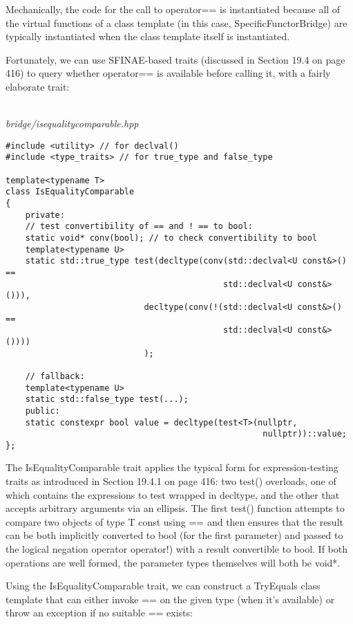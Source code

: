 \begin{tcolorbox}[colback=webgreen!5!white,colframe=webgreen!75!black]
\hspace*{0.75cm}Mechanically, the code for the call to operator== is instantiated because all of the virtual functions of a class template (in this case, SpecificFunctorBridge) are typically instantiated when the class template itself is instantiated.
\end{tcolorbox}

Fortunately, we can use SFINAE-based traits (discussed in Section 19.4 on page 416) to query whether operator== is available before calling it, with a fairly elaborate trait:

\hspace*{\fill} \\ %
\noindent
\textit{bridge/isequalitycomparable.hpp}
\begin{lstlisting}[style=styleCXX]
#include <utility> // for declval()
#include <type_traits> // for true_type and false_type

template<typename T>
class IsEqualityComparable
{
	private:
	// test convertibility of == and ! == to bool:
	static void* conv(bool); // to check convertibility to bool
	template<typename U>
	static std::true_type test(decltype(conv(std::declval<U const&>() ==
											std::declval<U const&>())),
							decltype(conv(!(std::declval<U const&>() ==
											std::declval<U const&>())))
							);
	
	// fallback:
	template<typename U>
	static std::false_type test(...);
	public:
	static constexpr bool value = decltype(test<T>(nullptr,
													nullptr))::value;
};
\end{lstlisting}

The IsEqualityComparable trait applies the typical form for expression-testing traits as introduced in Section 19.4.1 on page 416: two test() overloads, one of which contains the expressions to test wrapped in decltype, and the other that accepts arbitrary arguments via an ellipsis. The first test() function attempts to compare two objects of type T const using == and then ensures that the result can be both implicitly converted to bool (for the first parameter) and passed to the logical negation operator operator!) with a result convertible to bool. If both operations are well formed, the parameter types themselves will both be void*.

Using the IsEqualityComparable trait, we can construct a TryEquals class template that can either invoke == on the given type (when it’s available) or throw an exception if no suitable == exists:

